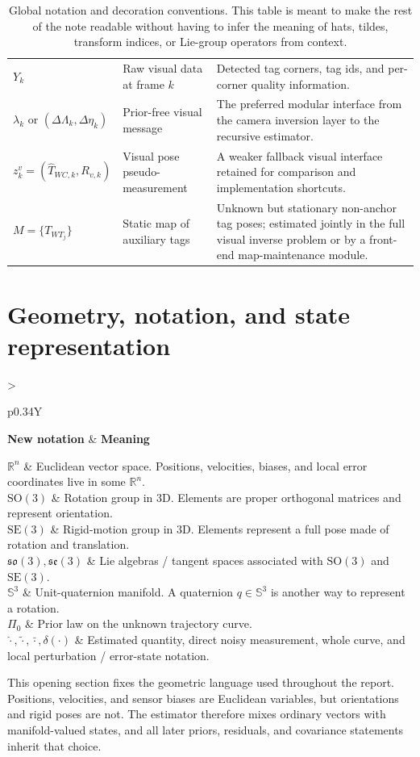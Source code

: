 \documentclass[11pt]{report}
\newcommand{\SO}{\mathrm{SO}(3)}
\newcommand{\SE}{\mathrm{SE}(3)}
\newcommand{\Sthree}{\mathbb{S}^3}
\newcommand{\soLie}{\mathfrak{so}(3)}
\newcommand{\seLie}{\mathfrak{se}(3)}
\newcommand{\R}{\mathbb{R}}
\newcommand{\NotationTable}[1]{%
\vspace{0.6mm}
{\scriptsize
\setlength{\tabcolsep}{2.5pt}
\begin{tabularx}{\columnwidth}{>{\raggedright\arraybackslash}p{0.34\columnwidth}Y}
\toprule
\textbf{New notation} & \textbf{Meaning}\\
\midrule
#1\\
\bottomrule
\end{tabularx}}
\vspace{0.8mm}}
\begin{document}
\begin{table}[t]
\begin{tabularx}{\textwidth}{p{}p{}X}
$Y_k$ & Raw visual data at frame $k$ & Detected tag corners, tag ids, and per-corner quality information.\\
$\lambda_k$ or $(\Delta\Lambda_k,\Delta\eta_k)$ & Prior-free visual message & The preferred modular interface from the camera inversion layer to the recursive estimator.\\
$z_k^v=(\widehat T_{WC,k},R_{v,k})$ & Visual pose pseudo-measurement & A weaker fallback visual interface retained for comparison and implementation shortcuts.\\
$M=\{T_{WT_j}\}$ & Static map of auxiliary tags & Unknown but stationary non-anchor tag poses; estimated jointly in the full visual inverse problem or by a front-end map-maintenance module.\\
\bottomrule
\end{tabularx}
\caption{Global notation and decoration conventions. This table is meant to make the rest of the note readable without having to infer the meaning of hats, tildes, transform indices, or Lie-group operators from context.}
\end{table}



\section{Geometry, notation, and state representation}
\NotationTable{
$\R^n$ & Euclidean vector space. Positions, velocities, biases, and local error coordinates live in some $\R^n$.\\
$\SO$ & Rotation group in 3D. Elements are proper orthogonal matrices and represent orientation.\\
$\SE$ & Rigid-motion group in 3D. Elements represent a full pose made of rotation and translation.\\
$\soLie,\seLie$ & Lie algebras / tangent spaces associated with $\SO$ and $\SE$.\\
$\Sthree$ & Unit-quaternion manifold. A quaternion $q\in\Sthree$ is another way to represent a rotation.\\
$\Pi_0$ & Prior law on the unknown trajectory curve.\\
$\widehat{\cdot},\widetilde{\cdot},\bar{\cdot},\delta(\cdot)$ & Estimated quantity, direct noisy measurement, whole curve, and local perturbation / error-state notation.}

This opening section fixes the geometric language used throughout the report. Positions, velocities, and sensor biases are Euclidean variables, but orientations and rigid poses are not. The estimator therefore mixes ordinary vectors with manifold-valued states, and all later priors, residuals, and covariance statements inherit that choice.
\end{document}
